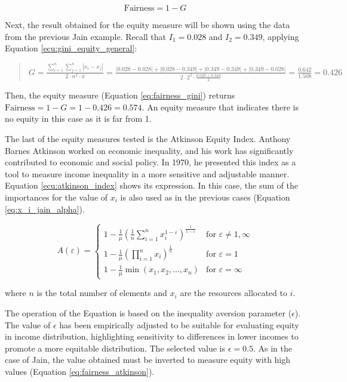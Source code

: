 \documentclass[preprint,12pt]{elsarticle}
\begin{document}
\begin{equation}
\text{Fairness} = 1 - G
\label{eq:fairness_gini}
\end{equation}


Next, the result obtained for the equity measure will be shown using the data from the previous Jain example. Recall that $I_1=0.028$ and $I_2=0.349$, applying Equation \ref{ecu:gini_equity_general}:
\begin{quote}
     $G = \frac{\sum_{i=1}^{n} \sum_{j=1}^{n} |x_i - x_j|}{2 \cdot n^2 \cdot \bar{x}} =  \frac{|0.028-0.028| + |0.028-0.349| + |0.349-0.349| + |0.349-0.028|}{2 \cdot 2^2 \cdot \frac{0.028+0.349}{2}} = \frac{0.642}{1.508} = 0.426$
\end{quote}


Then, the equity measure (Equation \ref{eq:fairness_gini}) returns $\text{Fairness} = 1 - G = 1 - 0.426 = 0.574$. An equity measure that indicates there is no equity in this case as it is far from 1.

The last of the equity measures tested is the Atkinson Equity Index. Anthony Barnes Atkinson worked on economic inequality, and his work has significantly contributed to economic and social policy. In 1970, he presented this index as a tool to measure income inequality in a more sensitive and adjustable manner. Equation \ref{ecu:atkinson_index} shows its expression. In this case, the sum of the importances for the value of $x_i$ is also used as in the previous cases (Equation \ref{eq:x_i_jain_alpha}).

\begin{equation}
A(\varepsilon) = 
\begin{cases} 
1 - \frac{1}{\mu} \left( \frac{1}{n} \sum_{i=1}^{n} x_i^{1-\varepsilon} \right)^{\frac{1}{1-\varepsilon}}  & \text{for } \varepsilon \neq 1, \infty \\
1 - \frac{1}{\mu} \left( \prod_{i=1}^{n} x_i \right)^{\frac{1}{n}} & \text{for } \varepsilon = 1 \\
1 - \frac{1}{\mu} \min(x_1, x_2, \ldots, x_n) & \text{for } \varepsilon = \infty
\end{cases}
\label{ecu:atkinson_index}
\end{equation}

where $n$ is the total number of elements and $x_i$ are the resources allocated to $i$.

The operation of the Equation is based on the inequality aversion parameter ($\epsilon$). The value of $\epsilon$ has been empirically adjusted to be suitable for evaluating equity in income distribution, highlighting sensitivity to differences in lower incomes to promote a more equitable distribution. The selected value is $\epsilon=0.5$. As in the case of Jain, the value obtained must be inverted to measure equity with high values (Equation \ref{eq:fairness_atkinson}).
\end{document}
